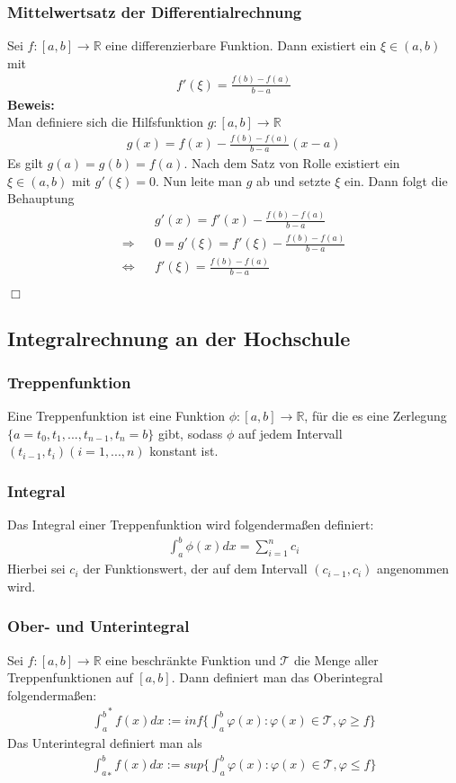 \documentclass[a4paper]{article}
\begin{document}
\subsubsection{Mittelwertsatz der Differentialrechnung}
Sei $f: [a,b] \rightarrow \mathbb{R}$ eine differenzierbare Funktion. Dann existiert ein $\xi \in (a,b)$ mit 
\begin{align*}
f'(\xi) = \frac{f(b) - f(a)}{b-a}
\end{align*}
\textbf{Beweis:} \\
Man definiere sich die Hilfsfunktion $g: [a,b] \rightarrow \mathbb{R}$
\begin{align*}
g(x) =f(x) - \frac{f(b) - f(a)}{b-a} (x-a)
\end{align*}
Es gilt $g(a) = g(b) = f(a)$. Nach dem Satz von Rolle existiert ein $\xi \in (a,b)$ mit $g'(\xi) = 0$. Nun leite man $g$ ab und setzte $\xi$ ein. Dann folgt die Behauptung
\begin{align*}
&& g'(x) = f'(x) - \frac{f(b) - f(a)}{b-a} \\
\Rightarrow && 0 = g'(\xi) = f'(\xi) - \frac{f(b) - f(a)}{b-a} \\
\Leftrightarrow && f'(\xi) = \frac{f(b) - f(a)}{b-a}
\end{align*}
\begin{flushright}
$\Box$
\end{flushright}
\subsection{Integralrechnung an der Hochschule}
\subsubsection{Treppenfunktion}
Eine Treppenfunktion ist eine Funktion $\phi: [a,b] \rightarrow \mathbb{R}$, für die es eine Zerlegung $\{a=t_0,t_1,...,t_{n-1},t_n=b\}$ gibt, sodass $\phi$ auf jedem Intervall $(t_{i-1},t_i) (i=1,...,n)$ konstant ist. 
\subsubsection{Integral}
Das Integral einer Treppenfunktion wird folgendermaßen definiert:
\begin{align*}
\int_a^b \phi(x) dx = \sum_{i=1}^{n} c_i
\end{align*}
Hierbei sei $c_i$ der Funktionswert, der auf dem Intervall $(c_{i-1},c_i)$ angenommen wird. 
\subsubsection{Ober- und Unterintegral}
Sei $f: [a,b] \rightarrow \mathbb{R}$ eine beschränkte Funktion und $\mathcal{T}$ die Menge aller Treppenfunktionen auf $[a,b]$. Dann definiert man das Oberintegral folgendermaßen:
\begin{align*}
{\int_a^b}^* f(x)dx := inf\{\int_a^b \varphi(x): \varphi(x) \in \mathcal{T}, \varphi \geq f\}
\end{align*} 
Das Unterintegral definiert man als
\begin{align*}
{\int_a^b}_* f(x)dx := sup\{\int_a^b \varphi(x): \varphi(x) \in \mathcal{T}, \varphi \leq f\}
\end{align*} 
\end{document}

